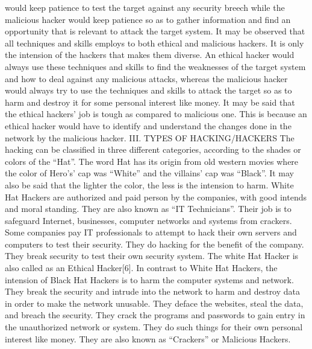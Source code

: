 would keep patience to test the target against any security 
breech while the malicious hacker would keep patience so 
as to gather information and find an opportunity that is 
relevant to attack the target system. It may be observed that 
all techniques and skills employs to both ethical and 
malicious hackers. It is only the intension of the hackers 
that makes them diverse. An ethical hacker would always 
use these techniques and skills to find the weaknesses of 
the target system and how to deal against any malicious 
attacks, whereas the malicious hacker would always try to 
use the techniques and skills to attack the target so as to 
harm and destroy it for some personal interest like money. 
It may be said that the ethical hackers’ job is tough as 
compared to malicious one. This is because an ethical 
hacker would have to identify and understand the changes 
done in the network by the malicious hacker. 
III. TYPES OF HACKING/HACKERS 
The hacking can be classified in three different categories, 
according to the shades or colors of the “Hat”. The word 
Hat has its origin from old western movies where the color 
of Hero’s’ cap was “White” and the villains’ cap was 
“Black”. It may also be said that the lighter the color, the 
less is the intension to harm. White Hat Hackers are 
authorized and paid person by the companies, with good 
intends and moral standing. They are also known as “IT 
Technicians”. Their job is to safeguard Internet, businesses, 
computer networks and systems from crackers. Some 
companies pay IT professionals to attempt to hack their 
own servers and computers to test their security. They do 
hacking for the benefit of the company. They break security 
to test their own security system. The white Hat Hacker is 
also called as an Ethical Hacker[6]. In contrast to White 
Hat Hackers, the intension of Black Hat Hackers is to harm 
the computer systems and network. They break the security 
and intrude into the network to harm and destroy data in 
order to make the network unusable. They deface the 
websites, steal the data, and breach the security. They crack 
the programs and passwords to gain entry in the 
unauthorized network or system. They do such things for 
their own personal interest like money. They are also 
known as “Crackers” or Malicious Hackers.

